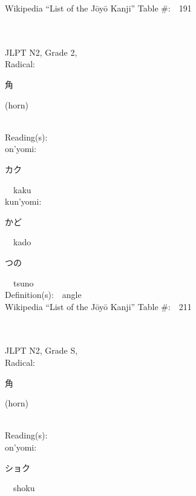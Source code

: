 \begin{multicols}{2}
Wikipedia ``List of the J\=oy\=o Kanji'' Table \#:\ \ 191 \\
\ \ \\
{\fontsize{34pt}{40pt}  }\ \ \\  %
{JLPT N2, Grade 2, \\Radical:\ \ {\begin{CJK}{UTF8}{min} 角 \end{CJK}} (horn) } \\
Reading(s):\ \ \\
{\hspace*{1em}}on'yomi:\ \ \\
{\hspace*{2em}}{\begin{CJK}{UTF8}{min} カク \end{CJK}}\ \ kaku\ \ \\
{\hspace*{1em}}kun'yomi:\ \ \\
{\hspace*{2em}}{\begin{CJK}{UTF8}{min} かど \end{CJK}}\ \ kado\ \ \\
{\hspace*{2em}}{\begin{CJK}{UTF8}{min} つの \end{CJK}}\ \ tsuno\ \ \\
Definition(s):\ \ angle \\
Wikipedia ``List of the J\=oy\=o Kanji'' Table \#:\ \ 211 \\
\ \ \\
{\fontsize{34pt}{40pt}  }\ \ \\  %
{JLPT N2, Grade S, \\Radical:\ \ {\begin{CJK}{UTF8}{min} 角 \end{CJK}} (horn) } \\
Reading(s):\ \ \\
{\hspace*{1em}}on'yomi:\ \ \\
{\hspace*{2em}}{\begin{CJK}{UTF8}{min} ショク \end{CJK}}\ \ shoku\ \ \\

\end{multicols}
